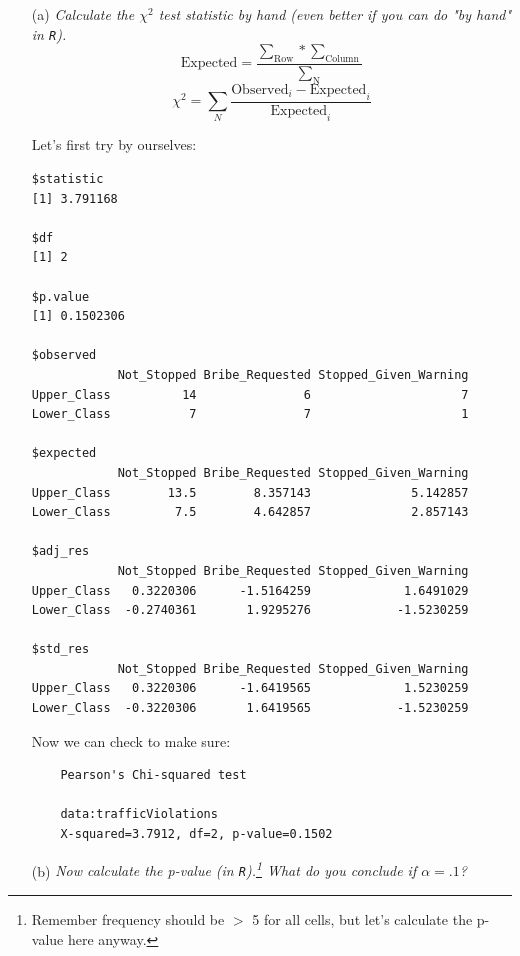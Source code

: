 \documentclass[12pt,letterpaper]{article}
\begin{document}
\begin{enumerate}
	
	\newpage
	\item [(a)]
	\textit{Calculate the $\chi^2$ test statistic by hand (even better if you can do "by hand" in \texttt{R}).}\\
	
	
	$$\text{Expected} =\frac{\sum_{\text{Row}}*\sum_{\text{Column}}}{\sum_{\text{N}}}$$
	$$\chi^2 = \sum_N \frac{\text{Observed}_i - \text{Expected}_i}{\text{Expected}_i}$$
	
	Let's first try by ourselves:		
	
	  
	\footnotesize
	\begin{verbatim}
$statistic
[1] 3.791168

$df
[1] 2

$p.value
[1] 0.1502306

$observed
            Not_Stopped Bribe_Requested Stopped_Given_Warning
Upper_Class          14               6                     7
Lower_Class           7               7                     1

$expected
            Not_Stopped Bribe_Requested Stopped_Given_Warning
Upper_Class        13.5        8.357143              5.142857
Lower_Class         7.5        4.642857              2.857143

$adj_res
            Not_Stopped Bribe_Requested Stopped_Given_Warning
Upper_Class   0.3220306      -1.5164259             1.6491029
Lower_Class  -0.2740361       1.9295276            -1.5230259

$std_res
            Not_Stopped Bribe_Requested Stopped_Given_Warning
Upper_Class   0.3220306      -1.6419565             1.5230259
Lower_Class  -0.3220306       1.6419565            -1.5230259
	\end{verbatim}
	\normalsize
	Now we can check to make sure:
	
	  
	\footnotesize
	\begin{verbatim}
	Pearson's Chi-squared test
	
	data:trafficViolations
	X-squared=3.7912, df=2, p-value=0.1502
	\end{verbatim}
	\normalsize
	\item [(b)]
	\textit{Now calculate the p-value (in \texttt{R}).\footnote{Remember frequency should be $>$ 5 for all cells, but let's calculate the p-value here anyway.}  What do you conclude if $\alpha = .1$?}\\
	

\end{enumerate}
\end{document}
